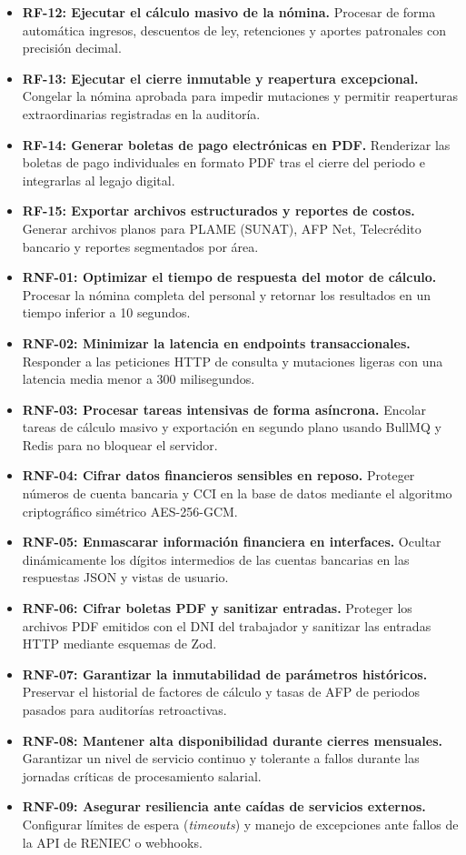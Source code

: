 \begin{itemize}
    \item \textbf{RF-12: Ejecutar el cálculo masivo de la nómina.} Procesar de forma automática ingresos, descuentos de ley, retenciones y aportes patronales con precisión decimal.
    \item \textbf{RF-13: Ejecutar el cierre inmutable y reapertura excepcional.} Congelar la nómina aprobada para impedir mutaciones y permitir reaperturas extraordinarias registradas en la auditoría.
    \item \textbf{RF-14: Generar boletas de pago electrónicas en PDF.} Renderizar las boletas de pago individuales en formato PDF tras el cierre del periodo e integrarlas al legajo digital.
    \item \textbf{RF-15: Exportar archivos estructurados y reportes de costos.} Generar archivos planos para PLAME (SUNAT), AFP Net, Telecrédito bancario y reportes segmentados por área.
\end{itemize}

\begin{itemize}
    \item \textbf{RNF-01: Optimizar el tiempo de respuesta del motor de cálculo.} Procesar la nómina completa del personal y retornar los resultados en un tiempo inferior a 10 segundos.
    \item \textbf{RNF-02: Minimizar la latencia en endpoints transaccionales.} Responder a las peticiones HTTP de consulta y mutaciones ligeras con una latencia media menor a 300 milisegundos.
    \item \textbf{RNF-03: Procesar tareas intensivas de forma asíncrona.} Encolar tareas de cálculo masivo y exportación en segundo plano usando BullMQ y Redis para no bloquear el servidor.
    \item \textbf{RNF-04: Cifrar datos financieros sensibles en reposo.} Proteger números de cuenta bancaria y CCI en la base de datos mediante el algoritmo criptográfico simétrico AES-256-GCM.
    \item \textbf{RNF-05: Enmascarar información financiera en interfaces.} Ocultar dinámicamente los dígitos intermedios de las cuentas bancarias en las respuestas JSON y vistas de usuario.
    \item \textbf{RNF-06: Cifrar boletas PDF y sanitizar entradas.} Proteger los archivos PDF emitidos con el DNI del trabajador y sanitizar las entradas HTTP mediante esquemas de Zod.
    \item \textbf{RNF-07: Garantizar la inmutabilidad de parámetros históricos.} Preservar el historial de factores de cálculo y tasas de AFP de periodos pasados para auditorías retroactivas.
    \item \textbf{RNF-08: Mantener alta disponibilidad durante cierres mensuales.} Garantizar un nivel de servicio continuo y tolerante a fallos durante las jornadas críticas de procesamiento salarial.
    \item \textbf{RNF-09: Asegurar resiliencia ante caídas de servicios externos.} Configurar límites de espera (\textit{timeouts}) y manejo de excepciones ante fallos de la API de RENIEC o webhooks.
\end{itemize}
